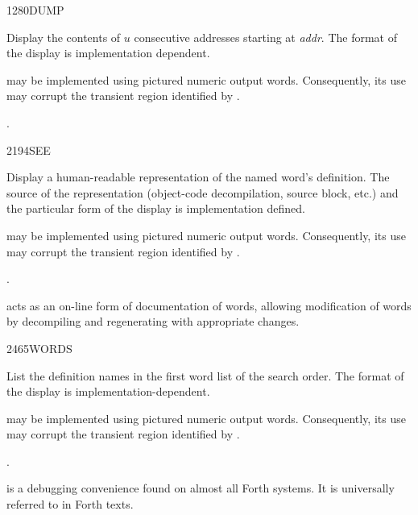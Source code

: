 \begin{newword}{1280}{DUMP}

	Display the contents of $u$ consecutive addresses starting at
	\emph{addr}. The format of the display is implementation
	dependent.

	 may be implemented using pictured numeric output
	words. Consequently, its use may corrupt the transient region
	identified by .

\item[See:]
	.
\end{newword}


\begin{newword}{2194}{SEE}

	Display a human-readable representation of the named word's
	definition. The source of the representation (object-code
	decompilation, source block, etc.) and the particular form of
	the display is implementation defined.

	 may be implemented using pictured numeric output
	words. Consequently, its use may corrupt the transient region
	identified by .

\item[See:]
	.

	\begin{rationale} %
		 acts as an on-line form of documentation of
		words, allowing modification of words by decompiling and
		regenerating with appropriate changes.
	\end{rationale}
\end{newword}


\begin{newword}{2465}{WORDS}
	\stack{}{}

	List the definition names in the first word list of the search
	order. The format of the display is implementation-dependent.

	 may be implemented using pictured numeric output
	words. Consequently, its use may corrupt the transient region
	identified by .

\item[See:]
	.

	\begin{rationale} %
		 is a debugging convenience found on almost
		all Forth systems. It is universally referred to in Forth texts.
	\end{rationale}
\end{newword}

